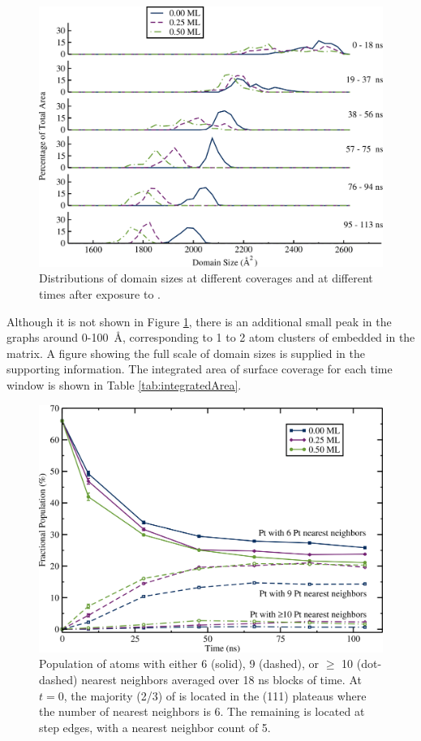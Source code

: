 \begin{figure}
\includegraphics[width=\linewidth]{../figures/chap3/domains_Pt_110ns.pdf}
\caption{Distributions of  domain sizes at different 
  coverages and at different times after exposure to .}
\label{fig:domainAreasPt}
\end{figure}

Although it is not shown in Figure \ref{fig:domainAreasPt}, there is
an additional small peak in the  graphs around 0-100~\AA,
corresponding to 1 to 2 atom clusters of  embedded in the
 matrix.  A figure showing the full scale of domain sizes is
supplied in the supporting information.  The integrated area of
surface coverage for each time window is shown in Table
\ref{tab:integratedArea}.

\begin{figure}
  \includegraphics[width=\linewidth]{../figures/chap3/nn.pdf}
  \caption{Population of  atoms with either 6 (solid), 9
    (dashed), or $\ge$ 10 (dot-dashed)  nearest neighbors
    averaged over 18 ns blocks of time.  At $t=0$, the majority
    (2/3) of  is located in the (111) plateaus where
    the number of  nearest neighbors is 6. The remaining
     is located at step edges, with a nearest neighbor 
    count of 5.} \label{fig:nearestNeighbors}
\end{figure}

